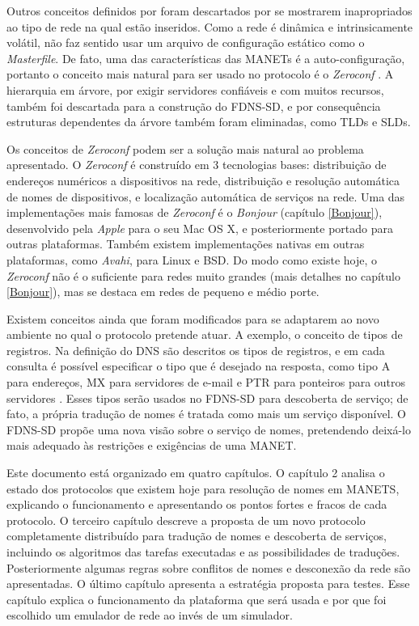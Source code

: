 Outros conceitos definidos por \cite{rfc1035} foram descartados por se mostrarem
inapropriados ao tipo de rede na qual estão inseridos. Como a rede é dinâmica e
intrinsicamente volátil, não faz sentido usar um arquivo de configuração estático
como o \textit{Masterfile}. De fato, uma das características das MANETs é a
auto-configuração, portanto o conceito mais natural para ser usado no protocolo
é o \textit{Zeroconf} \cite{zeroconf}. A hierarquia em árvore, por exigir servidores
confiáveis e com muitos recursos, também foi descartada para a construção do
FDNS-SD, e por consequência estruturas dependentes da árvore também foram eliminadas,
como TLDs e SLDs.

Os conceitos de \textit{Zeroconf} podem ser a solução mais natural ao problema
apresentado. O \textit{Zeroconf} é construído em 3 tecnologias bases: distribuição
de endereços numéricos a dispositivos na rede, distribuição e resolução automática
de nomes de dispositivos, e localização automática de serviços na rede. Uma das
implementações mais famosas de \textit{Zeroconf} é o \textit{Bonjour} (capítulo \ref{Bonjour}),
desenvolvido pela \textit{Apple} para o seu Mac OS X, e posteriormente portado
para outras plataformas. Também existem implementações nativas em outras
plataformas, como \textit{Avahi}, para Linux e BSD. Do modo como existe hoje, o
\textit{Zeroconf} não é o suficiente para redes muito grandes (mais detalhes no
capítulo \ref{Bonjour}), mas se destaca em redes de pequeno e médio porte.

Existem conceitos ainda que foram modificados para se adaptarem ao novo ambiente
no qual o protocolo pretende atuar. A exemplo, o conceito de tipos de registros.
Na definição do DNS são descritos os tipos de registros, e em cada consulta é
possível especificar o tipo que é desejado na resposta, como tipo A para endereços,
MX para servidores de e-mail e PTR para ponteiros para outros servidores \cite{rfc1035}.
Esses tipos serão usados no FDNS-SD para descoberta de serviço; de
fato, a própria tradução de nomes é tratada como mais um serviço disponível. O
FDNS-SD propõe uma nova visão sobre o serviço de nomes, pretendendo deixá-lo mais
adequado às restrições e exigências de uma MANET.

Este documento está organizado em quatro capítulos. O capítulo 2 analisa o estado
dos protocolos que existem hoje para resolução de nomes em MANETS, explicando o
funcionamento e apresentando os pontos fortes e fracos de cada protocolo.
O terceiro capítulo descreve a proposta de um novo protocolo completamente
distribuído para tradução de nomes e descoberta de serviços, incluindo os
algoritmos das tarefas executadas e as possibilidades de traduções. Posteriormente
algumas regras sobre conflitos de nomes e desconexão da rede são apresentadas.
O último capítulo apresenta a estratégia proposta para testes. Esse capítulo
explica o funcionamento da plataforma que será usada e por que foi escolhido um
emulador de rede ao invés de um simulador.